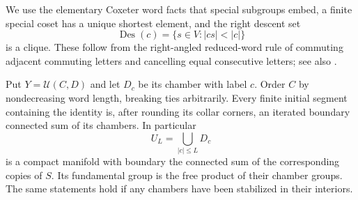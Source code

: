 We use the elementary Coxeter word facts that special subgroups embed,
a finite special coset has a unique shortest element, and the right
descent set
\[
 \operatorname{Des}(c)=\{s\in V:|cs|<|c|\}
\]
is a clique.  These follow from the right-angled reduced-word rule of
commuting adjacent commuting letters and cancelling equal consecutive
letters; see also \cite[Chapters~4--5]{Davis}.

\begin{lemma}
\label{rf:shelling}
Put $Y=\mathcal U(C,D)$ and let $D_c$ be its chamber with label $c$.
Order $C$ by nondecreasing word length, breaking ties arbitrarily.
Every finite initial segment containing the identity is, after rounding
its collar corners, an iterated boundary connected sum of its chambers.
In particular
\[
 U_L=\bigcup_{|c|\leq L}D_c
\]
is a compact manifold with boundary the connected sum of the corresponding
copies of $S$.  Its fundamental group is the free product of their
chamber groups.  The same statements hold if any chambers have been
stabilized in their interiors.
\end{lemma}

